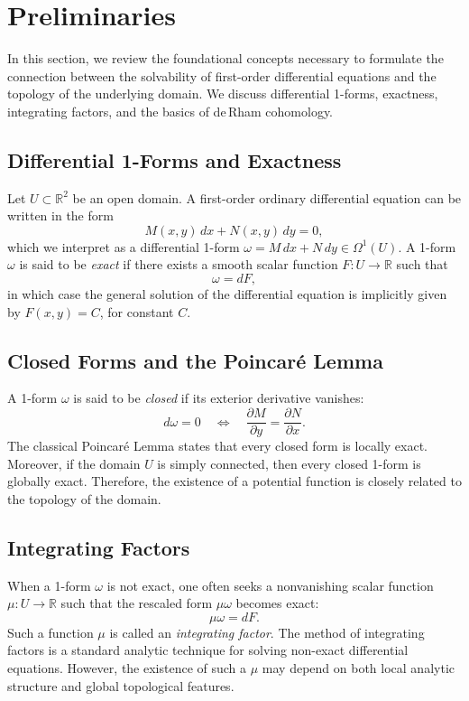 \documentclass{amsart}
\theoremstyle{definition}
\theoremstyle{remark}
\numberwithin{equation}{section}
\begin{document}
\section{Preliminaries}

In this section, we review the foundational concepts necessary to formulate the connection between the solvability of first-order differential equations and the topology of the underlying domain. We discuss differential 1-forms, exactness, integrating factors, and the basics of de\,Rham cohomology.

\subsection{Differential 1-Forms and Exactness}

Let \( U \subset \mathbb{R}^2 \) be an open domain. A first-order ordinary differential equation can be written in the form
\[
M(x, y)\,dx + N(x, y)\,dy = 0,
\]
which we interpret as a differential 1-form \( \omega = M\,dx + N\,dy \in \Omega^1(U) \). A 1-form \( \omega \) is said to be \emph{exact} if there exists a smooth scalar function \( F: U \to \mathbb{R} \) such that
\[
\omega = dF,
\]
in which case the general solution of the differential equation is implicitly given by \( F(x, y) = C \), for constant \( C \). 

\subsection{Closed Forms and the Poincaré Lemma}

A 1-form \( \omega \) is said to be \emph{closed} if its exterior derivative vanishes:
\[
d\omega = 0 \quad \iff \quad \frac{\partial M}{\partial y} = \frac{\partial N}{\partial x}.
\]
The classical Poincaré Lemma states that every closed form is locally exact. Moreover, if the domain \( U \) is simply connected, then every closed 1-form is globally exact. Therefore, the existence of a potential function is closely related to the topology of the domain.

\subsection{Integrating Factors}

When a 1-form \( \omega \) is not exact, one often seeks a nonvanishing scalar function \( \mu: U \to \mathbb{R} \) such that the rescaled form \( \mu\omega \) becomes exact:
\[
\mu \omega = dF.
\]
Such a function \( \mu \) is called an \emph{integrating factor}. The method of integrating factors is a standard analytic technique for solving non-exact differential equations. However, the existence of such a \( \mu \) may depend on both local analytic structure and global topological features.
\end{document}
